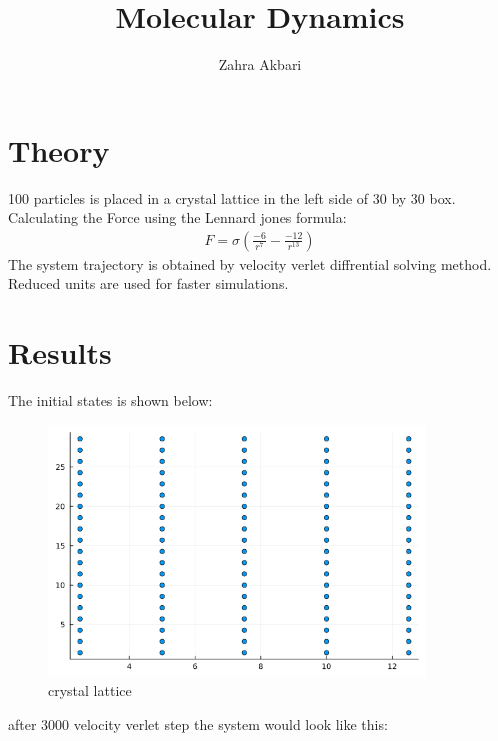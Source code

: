 \documentclass[12pt,a4paper]{article}
\title{Molecular Dynamics}
\author{Zahra Akbari}
\date{}
\begin{document}
	\maketitle
	\section*{Theory }
	100 particles is placed in a crystal lattice in the left side of 30 by 30 box. Calculating the Force using the Lennard jones formula:
	\begin{align*}
		F = \sigma (\frac{-6}{r^7}-\frac{-12}{r^{13}})
	\end{align*}
	The system trajectory is obtained by velocity verlet diffrential solving method. Reduced units are used for faster simulations.

	


	\section*{Results}
	The initial states is shown below:
	\begin{figure}[H]
		\centering
		\includegraphics[width=10cm]{box0.png}
		\caption{crystal lattice }

	\end{figure}

	after 3000 velocity verlet step the system would look like this:
	
\end{document}
